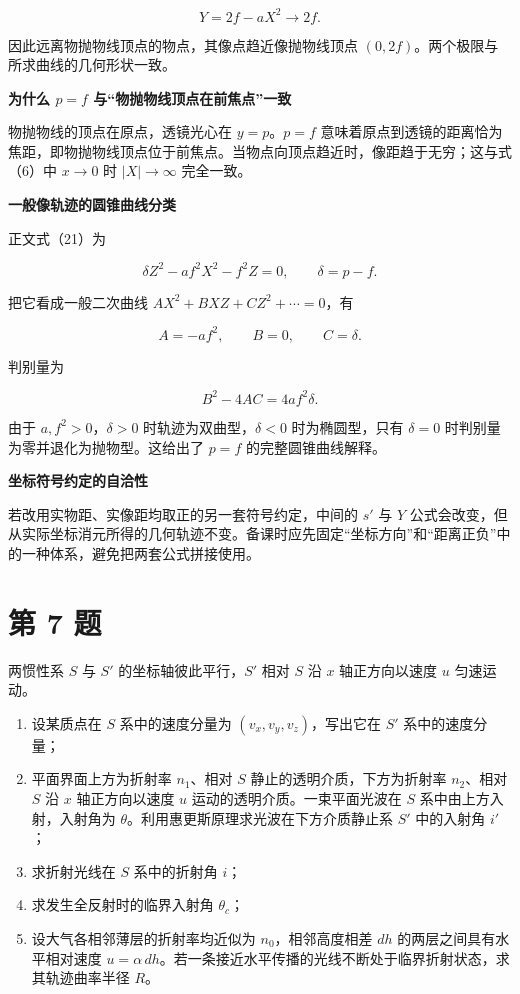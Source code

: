 \documentclass[12pt,a4paper,UTF8]{ctexart}
\newcommand{\tightlist}{\setlength{\itemsep}{0pt}\setlength{\parskip}{0pt}}
\begin{document}
\[
Y=2f-aX^2\to2f.
\]

因此远离物抛物线顶点的物点，其像点趋近像抛物线顶点
\((0,2f)\)。两个极限与所求曲线的几何形状一致。

\textbf{为什么 \(p=f\) 与``物抛物线顶点在前焦点''一致}

物抛物线的顶点在原点，透镜光心在 \(y=p\)。\(p=f\)
意味着原点到透镜的距离恰为焦距，即物抛物线顶点位于前焦点。当物点向顶点趋近时，像距趋于无穷；这与式（6）中
\(x\to0\) 时 \(|X|\to\infty\) 完全一致。

\textbf{一般像轨迹的圆锥曲线分类}

正文式（21）为

\[
\delta Z^2-af^2X^2-f^2Z=0,
\qquad \delta=p-f.
\]

把它看成一般二次曲线 \(AX^2+B XZ+CZ^2+\cdots=0\)，有

\[
A=-af^2,
\qquad B=0,
\qquad C=\delta.
\]

判别量为

\[
B^2-4AC=4af^2\delta.
\]

由于 \(a,f^2>0\)，\(\delta>0\) 时轨迹为双曲型，\(\delta<0\)
时为椭圆型，只有 \(\delta=0\) 时判别量为零并退化为抛物型。这给出了
\(p=f\) 的完整圆锥曲线解释。

\textbf{坐标符号约定的自洽性}

若改用实物距、实像距均取正的另一套符号约定，中间的 \(s'\) 与 \(Y\)
公式会改变，但从实际坐标消元所得的几何轨迹不变。备课时应先固定``坐标方向''和``距离正负''中的一种体系，避免把两套公式拼接使用。

\newpage

\section{第 7 题}\label{ux7b2c-7-ux9898}

两惯性系 \(S\) 与 \(S'\) 的坐标轴彼此平行，\(S'\) 相对 \(S\) 沿 \(x\)
轴正方向以速度 \(u\) 匀速运动。

\begin{enumerate}
\def\labelenumi{\arabic{enumi}.}
\tightlist
\item
  设某质点在 \(S\) 系中的速度分量为 \((v_x,v_y,v_z)\)，写出它在 \(S'\)
  系中的速度分量；
\item
  平面界面上方为折射率 \(n_1\)、相对 \(S\) 静止的透明介质，下方为折射率
  \(n_2\)、相对 \(S\) 沿 \(x\) 轴正方向以速度 \(u\)
  运动的透明介质。一束平面光波在 \(S\) 系中由上方入射，入射角为
  \(\theta\)。利用惠更斯原理求光波在下方介质静止系 \(S'\) 中的入射角
  \(i'\)；
\item
  求折射光线在 \(S\) 系中的折射角 \(i\)；
\item
  求发生全反射时的临界入射角 \(\theta_c\)；
\item
  设大气各相邻薄层的折射率均近似为 \(n_0\)，相邻高度相差 \(dh\)
  的两层之间具有水平相对速度
  \(u=\alpha\,dh\)。若一条接近水平传播的光线不断处于临界折射状态，求其轨迹曲率半径
  \(R\)。
\end{enumerate}
\end{document}
